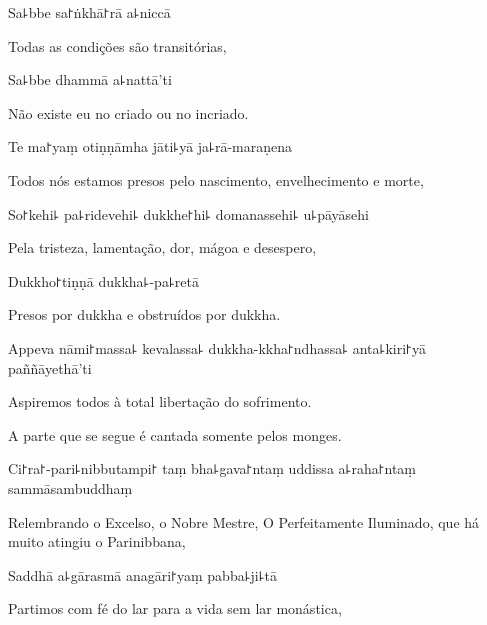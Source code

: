 Sa꜕bbe sa꜓ṅkhā꜓rā a꜕niccā

\begin{english}
  Todas as condições são transitórias,
\end{english}

Sa꜕bbe dhammā a꜕nattā'ti

\begin{english}
  Não existe eu no criado ou no incriado.
\end{english}

Te ma꜓yaṃ otiṇṇāmha jāti꜕yā ja꜕rā-maraṇena

\begin{english}
  Todos nós estamos presos pelo nascimento, envelhecimento e morte,
\end{english}

So꜓kehi꜕ pa꜕ridevehi꜕ dukkhe꜓hi꜕ domanassehi꜕ u꜕pāyāsehi

\begin{english}
  Pela tristeza, lamentação, dor, mágoa e desespero,
\end{english}

Dukkho꜓tiṇṇā dukkha꜕-pa꜕retā

\begin{english}
  Presos por dukkha e obstruídos por dukkha.
\end{english}

Appeva nāmi꜓massa꜕ kevalassa꜕ dukkha-kkha꜓ndhassa꜕ anta꜕kiri꜓yā \\paññāyethā'ti

\begin{english}
  Aspiremos todos à total libertação do sofrimento.
\end{english}

\begin{instruction}
  A parte que se segue é cantada somente pelos monges.
\end{instruction}

Ci꜓ra꜓-pari꜕nibbutampi꜓ taṃ bha꜕gava꜓ntaṃ uddissa a꜕raha꜓ntaṃ sammāsambuddhaṃ

\begin{english}
  Relembrando o Excelso, o Nobre Mestre, O Perfeitamente Iluminado, que há muito atingiu o Parinibbana,
\end{english}

Saddhā a꜕gārasmā anagāri꜓yaṃ pabba꜕ji꜕tā

\begin{english}
  Partimos com fé do lar para a vida sem lar monástica,
\end{english}

